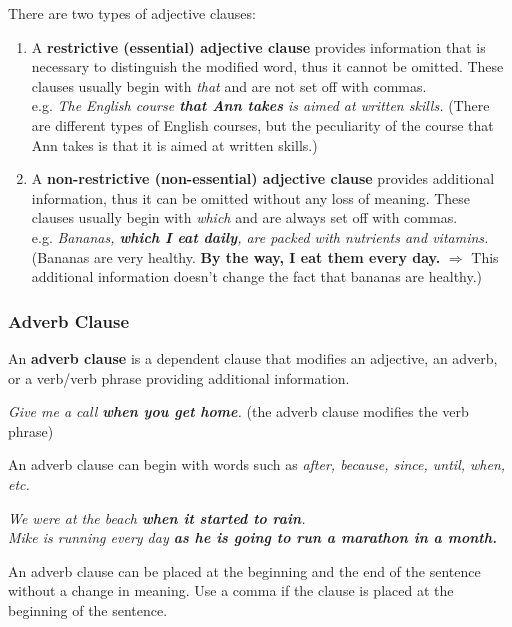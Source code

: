 \documentclass[hidelinks,10pt,a4paper]{article}
\begin{document}
There are two types of adjective clauses:

\begin{enumerate}[label=(\alph*)]
	\item A \textbf{restrictive (essential) adjective clause} provides information that is necessary to distinguish the modified word, thus it cannot be omitted. These clauses usually begin with \textit{that} and are not set off with commas. \\
		e.g. \textit{The English course \textbf{that Ann takes} is aimed at written skills.} (There are different types of English courses, but the peculiarity of the course that Ann takes is that it is aimed at written skills.)

	\item A \textbf{non-restrictive (non-essential) adjective clause} provides additional information, thus it can be omitted without any loss of meaning. These clauses usually begin with \textit{which} and are always set off with commas. \\
		e.g. \textit{Bananas, \textbf{which I eat daily}, are packed with nutrients and vitamins.} (Bananas are very healthy. \textbf{By the way, I eat them every day.} $\Rightarrow$ This additional information doesn't change the fact that bananas are healthy.)
\end{enumerate}

\subsubsection{Adverb Clause}
An \textbf{adverb clause} is a dependent clause that modifies an adjective, an adverb, or a verb/verb phrase providing additional information.

\begin{center}
	\textit{Give me a call \textbf{when you get home}.} (the adverb clause modifies the verb phrase)
\end{center}

An adverb clause can begin with words such as \textit{after, because, since, until, when, etc.}

\begin{center}
	\textit{We were at the beach \textbf{when it started to rain}.}\\
	\textit{Mike is running every day \textbf{as he is going to run a marathon in a month.} }
\end{center}

An adverb clause can be placed at the beginning and the end of the sentence without a change in meaning. Use a comma if the clause is placed at the beginning of the sentence.
\end{document}
